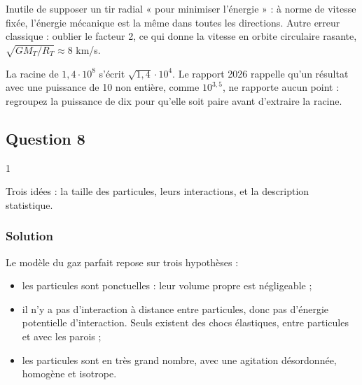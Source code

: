 \documentclass[11pt,a4paper]{article}
\providecommand{\tightlist}{\setlength{\itemsep}{0pt}\setlength{\parskip}{0pt}}
\newcommand{\equationajustee}[1]{%
  \sbox{\boiteequation}{$\displaystyle #1$}%
  \ifdim\wd\boiteequation>\linewidth
    \[\resizebox{\linewidth}{!}{\usebox{\boiteequation}}\]%
  \else
    \[#1\]%
  \fi}
\begin{document}
\equationajustee{\boxed{v_\ell\approx1{,}2\cdot10^4\ \mathrm{m\,s^{-1}}}}

\begin{piege}

Inutile de supposer un tir radial « pour minimiser l'énergie » : à norme de vitesse fixée, l'énergie mécanique est la même dans toutes les directions. Autre erreur classique : oublier le facteur 2, ce qui donne la vitesse en orbite circulaire rasante, \(\sqrt{GM_T/R_T}\approx8\) km/s.

\end{piege}

\begin{piege}

La racine de \(1{,}4\cdot10^8\) s'écrit \(\sqrt{1{,}4}\cdot10^4\). Le rapport 2026 rappelle qu'un résultat avec une puissance de 10 non entière, comme \(10^{3{,}5}\), ne rapporte aucun point : regroupez la puissance de dix pour qu'elle soit paire avant d'extraire la racine.

\end{piege}

\hypertarget{question-8}{%
\subsection{Question 8}\label{question-8}}

\begin{indication}{1}

Trois idées : la taille des particules, leurs interactions, et la description statistique.

\end{indication}

\hypertarget{solution-7}{%
\subsubsection{Solution}\label{solution-7}}

Le modèle du gaz parfait repose sur trois hypothèses :

\begin{itemize}
\tightlist
\item
  les particules sont ponctuelles : leur volume propre est négligeable ;
\item
  il n'y a pas d'interaction à distance entre particules, donc pas d'énergie potentielle d'interaction. Seuls existent des chocs élastiques, entre particules et avec les parois ;
\item
  les particules sont en très grand nombre, avec une agitation désordonnée, homogène et isotrope.
\end{itemize}
\end{document}
